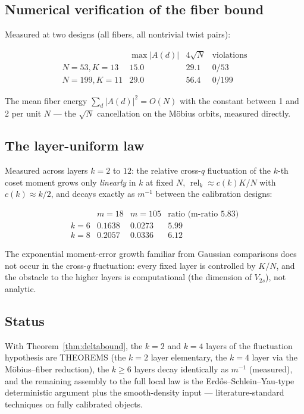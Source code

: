 \subsection{Numerical verification of the fiber bound}

Measured at two designs (all fibers, all nontrivial twist pairs):

\[
\begin{array}{lccc}
 & \max |A(d)| & 4\sqrt{N} & \text{violations}\\
N = 53, K = 13 & 15.0 & 29.1 & 0/53\\
N = 199, K = 11 & 29.0 & 56.4 & 0/199
\end{array}
\]

The mean fiber energy $\sum_d |A(d)|^2 = O(N)$ with the constant
between 1 and 2 per unit $N$ --- the $\sqrt{N}$ cancellation on the
M\"obius orbits, measured directly.

\subsection{The layer-uniform law}

Measured across layers $k = 2$ to $12$: the relative cross-$q$
fluctuation of the $k$-th coset moment grows only \emph{linearly} in
$k$ at fixed $N$, $\operatorname{rel}_k \approx c(k) K/N$ with
$c(k) \approx k/2$, and decays exactly as $m^{-1}$ between the
calibration designs:

\[
\begin{array}{lccc}
 & m = 18 & m = 105 & \text{ratio (m-ratio } 5.83)\\
k = 6 & 0.1638 & 0.0273 & 5.99\\
k = 8 & 0.2057 & 0.0336 & 6.12
\end{array}
\]

The exponential moment-error growth familiar from Gaussian
comparisons does not occur in the cross-$q$ fluctuation: every fixed
layer is controlled by $K/N$, and the obstacle to the higher layers is
computational (the dimension of $V_{2s}$), not analytic.

\subsection{Status}

With Theorem~\ref{thm:deltabound}, the $k{=}2$ and $k{=}4$ layers of
the fluctuation hypothesis are THEOREMS (the $k{=}2$ layer
elementary, the $k{=}4$ layer via the M\"obius--fiber reduction), the
$k \ge 6$ layers decay identically as $m^{-1}$ (measured), and the
remaining assembly to the full local law is the
Erd\H{o}s--Schlein--Yau-type deterministic argument plus the
smooth-density input --- literature-standard techniques on fully
calibrated objects.
